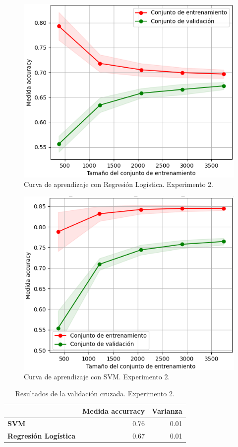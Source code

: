 \begin{figure}
\begin{center}
\includegraphics[width= 0.5\columnwidth]{Graphics/3}
\caption{Curva de aprendizaje con Regresi\'on Log\'istica. Experimento 2.}
\label{carl2}
\end{center}
\end{figure}

\begin{figure}
\begin{center}
\includegraphics[width= 0.5\columnwidth]{Graphics/4}
\caption{Curva de aprendizaje con SVM. Experimento 2.}
\label{casvm2}
\end{center}
\end{figure}

\begin{table}
\begin{center}
\begin{tabular}{l|r|r} 
   & \bf Medida accurracy & \bf Varianza \\ \hline
 \bf SVM & 0.76 & 0.01 \\ 
 \bf Regresi\'on Log\'istica & 0.67 & 0.01 \\ 

\end{tabular}
\caption{Resultados de la validaci\'on cruzada. Experimento 2.}\label{r2}
\end{center}
\end{table}

